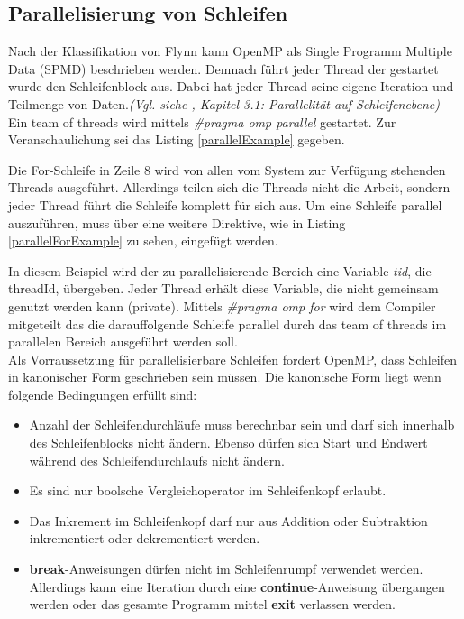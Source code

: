 \documentclass[11pt]{scrartcl}
\begin{document}
\subsection{Parallelisierung von Schleifen} 
Nach der Klassifikation von Flynn kann OpenMP als Single Programm Multiple Data (SPMD) beschrieben werden. Demnach führt jeder Thread der gestartet wurde den Schleifenblock aus. Dabei hat jeder Thread seine eigene Iteration und Teilmenge von Daten.\textit{(Vgl. siehe \cite{omp08}, Kapitel 3.1: Parallelität auf Schleifenebene)} \\
Ein team of threads wird mittels \textit{\#pragma omp parallel} gestartet. Zur Veranschaulichung sei das Listing \ref{parallelExample} gegeben. 


Die For-Schleife in Zeile 8 wird von allen vom System zur Verfügung stehenden Threads ausgeführt. Allerdings teilen sich die Threads nicht die Arbeit, sondern jeder Thread führt die Schleife komplett für sich aus. Um eine Schleife parallel auszuführen, muss über eine weitere Direktive, wie in Listing \ref{parallelForExample} zu sehen, eingefügt werden. 


In diesem Beispiel wird der zu parallelisierende Bereich eine Variable \textit{tid}, die threadId, übergeben. Jeder Thread erhält diese Variable, die nicht gemeinsam genutzt werden kann (private). Mittels \textit{\#pragma omp for} wird dem Compiler mitgeteilt das die darauffolgende Schleife parallel durch das team of threads  im parallelen Bereich ausgeführt werden soll. \\
Als Vorraussetzung für parallelisierbare Schleifen fordert OpenMP, dass Schleifen in kanonischer Form geschrieben sein müssen. Die kanonische Form liegt wenn folgende Bedingungen erfüllt sind: 
\begin{itemize}
\item Anzahl der Schleifendurchläufe muss berechnbar sein und darf sich innerhalb des Schleifenblocks nicht ändern. Ebenso dürfen sich Start und Endwert während des Schleifendurchlaufs nicht ändern.
\item Es sind nur boolsche Vergleichoperator im Schleifenkopf erlaubt.
\item Das Inkrement im Schleifenkopf darf nur aus Addition oder Subtraktion inkrementiert oder dekrementiert werden. 
\item \textbf{break}-Anweisungen dürfen nicht im Schleifenrumpf verwendet werden. Allerdings kann eine Iteration durch eine \textbf{continue}-Anweisung übergangen werden oder das gesamte Programm mittel \textbf{exit} verlassen werden.
\end{itemize}
\end{document}
